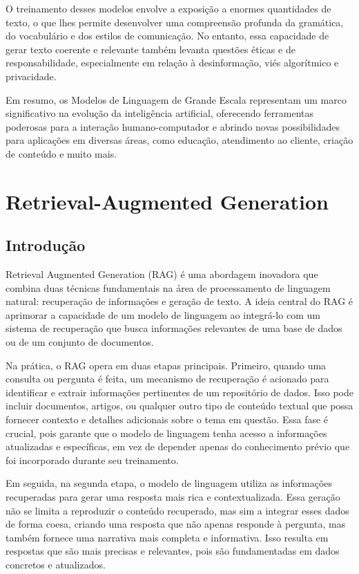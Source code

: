 \documentclass[14pt,a4paper,oneside]{book}
\begin{document}
O treinamento desses modelos envolve a exposição a enormes quantidades de texto, o que lhes permite desenvolver uma compreensão profunda da gramática, do vocabulário e dos estilos de comunicação. No entanto, essa capacidade de gerar texto coerente e relevante também levanta questões éticas e de responsabilidade, especialmente em relação à desinformação, viés algorítmico e privacidade.

Em resumo, os Modelos de Linguagem de Grande Escala representam um marco significativo na evolução da inteligência artificial, oferecendo ferramentas poderosas para a interação humano-computador e abrindo novas possibilidades para aplicações em diversas áreas, como educação, atendimento ao cliente, criação de conteúdo e muito mais.


\chapter{Retrieval-Augmented Generation}

\section{Introdução}

Retrieval Augmented Generation (RAG) é uma abordagem inovadora que combina duas técnicas fundamentais na área de processamento de linguagem natural: recuperação de informações e geração de texto. A ideia central do RAG é aprimorar a capacidade de um modelo de linguagem ao integrá-lo com um sistema de recuperação que busca informações relevantes de uma base de dados ou de um conjunto de documentos.

Na prática, o RAG opera em duas etapas principais. Primeiro, quando uma consulta ou pergunta é feita, um mecanismo de recuperação é acionado para identificar e extrair informações pertinentes de um repositório de dados. Isso pode incluir documentos, artigos, ou qualquer outro tipo de conteúdo textual que possa fornecer contexto e detalhes adicionais sobre o tema em questão. Essa fase é crucial, pois garante que o modelo de linguagem tenha acesso a informações atualizadas e específicas, em vez de depender apenas do conhecimento prévio que foi incorporado durante seu treinamento.

Em seguida, na segunda etapa, o modelo de linguagem utiliza as informações recuperadas para gerar uma resposta mais rica e contextualizada. Essa geração não se limita a reproduzir o conteúdo recuperado, mas sim a integrar esses dados de forma coesa, criando uma resposta que não apenas responde à pergunta, mas também fornece uma narrativa mais completa e informativa. Isso resulta em respostas que são mais precisas e relevantes, pois são fundamentadas em dados concretos e atualizados.
\end{document}
